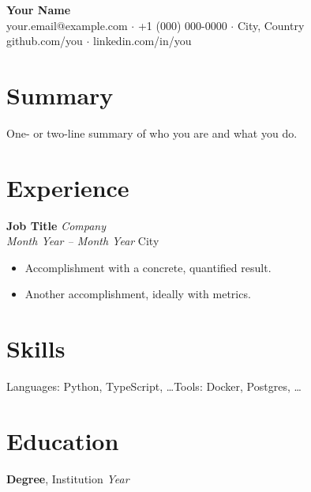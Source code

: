 \documentclass[10pt]{article}
\begin{document}
\begin{center}
  {\LARGE \textbf{Your Name}}\\[2pt]
  your.email@example.com $\cdot$ +1 (000) 000-0000 $\cdot$ City, Country\\
  github.com/you $\cdot$ linkedin.com/in/you
\end{center}

\section{Summary}
One- or two-line summary of who you are and what you do.

\section{Experience}
\textbf{Job Title} \hfill \textit{Company} \\
\textit{Month Year -- Month Year} \hfill City
\begin{itemize}
  \item Accomplishment with a concrete, quantified result.
  \item Another accomplishment, ideally with metrics.
\end{itemize}

\section{Skills}
Languages: Python, TypeScript, \dots \quad Tools: Docker, Postgres, \dots

\section{Education}
\textbf{Degree}, Institution \hfill \textit{Year}
\end{document}
